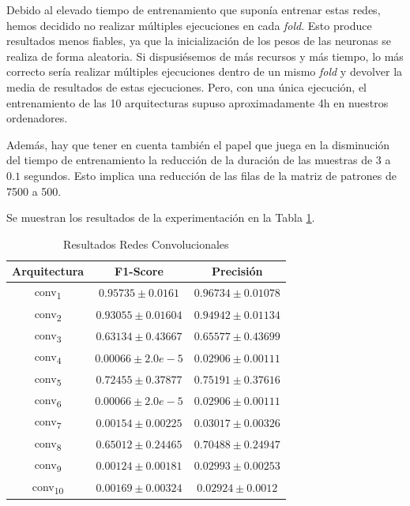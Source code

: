 \documentclass[12pt]{article}
\begin{document}
\bigskip
Debido al elevado tiempo de entrenamiento que suponía entrenar estas redes, hemos decidido
no realizar múltiples ejecuciones en cada \textit{fold}. Esto produce resultados menos fiables,
ya que la inicialización de los pesos de las neuronas se realiza de forma aleatoria. Si dispusiésemos
de más recursos y más tiempo, lo más correcto sería realizar múltiples ejecuciones dentro de un
mismo \textit{fold} y devolver la media de resultados de estas ejecuciones. Pero, con una única ejecución,
el entrenamiento de las 10 arquitecturas supuso aproximadamente 4h en nuestros ordenadores. 

\bigskip
Además, hay que tener en cuenta también el papel que juega en la disminución del tiempo de entrenamiento
la reducción de la duración de las muestras de $3$ a $0.1$ segundos. Esto implica una reducción de las filas de la matriz de patrones 
de 7500 a 500.

\bigskip
Se muestran los resultados de la experimentación en la Tabla \ref{Tab:CONV_6}.

\begin{table}[!ht]
	\caption{Resultados Redes Convolucionales}
	\centering
		 \begin{tabular}{||c c c||}
			 \hline
			 Arquitectura & F1-Score & Precisión  \\ [0.5ex]
			 \hline\hline
			 conv\textsubscript{1} & $0.95735 \pm 0.0161$ & $0.96734 \pm 0.01078$ \\
			 \hline
			 conv\textsubscript{2} & $0.93055 \pm 0.01604$ & $0.94942 \pm 0.01134$ \\
			 \hline
			 conv\textsubscript{3} & $0.63134 \pm 0.43667$ & $0.65577 \pm 0.43699$ \\
			 \hline
			 conv\textsubscript{4} & $0.00066 \pm 2.0e-5$ & $0.02906 \pm 0.00111$ \\
			 \hline
			 conv\textsubscript{5} & $0.72455 \pm 0.37877$ & $0.75191 \pm 0.37616$ \\
			 \hline
			 conv\textsubscript{6} & $0.00066 \pm 2.0e-5$ & $0.02906 \pm 0.00111$ \\
			 \hline
			 conv\textsubscript{7} & $0.00154 \pm 0.00225$ & $0.03017 \pm 0.00326$ \\
			 \hline
			 conv\textsubscript{8} & $0.65012 \pm 0.24465$ & $0.70488 \pm 0.24947$ \\
			 \hline
			 conv\textsubscript{9} & $0.00124 \pm 0.00181$ & $0.02993 \pm 0.00253$ \\
			 \hline
			 conv\textsubscript{10} & $0.00169 \pm 0.00324$ & $0.02924 \pm 0.0012$ \\
			 \hline
		 \end{tabular}
	\label{Tab:CONV_6}
	\end{table}
\end{document}
